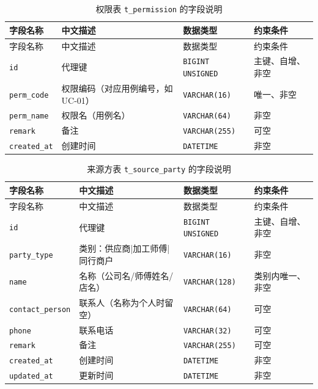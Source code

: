\documentclass[12pt, a4paper]{ctexart}
\newcommand{\code}[1]{\texttt{\small #1}}
\begin{document}
\begin{longtable}{@{}p{3.1cm} p{4.5cm} p{2.4cm} p{4.5cm}@{}}
\caption{权限表 \code{t\_permission} 的字段说明}\label{tab:f-t-permission}\\
\toprule
字段名称 & 中文描述 & 数据类型 & 约束条件 \\
\midrule
\endfirsthead
\toprule
字段名称 & 中文描述 & 数据类型 & 约束条件 \\
\midrule
\endhead
\bottomrule
\endlastfoot
\code{id} & 代理键 & \code{BIGINT UNSIGNED} & 主键、自增、非空 \\
\code{perm\_code} & 权限编码（对应用例编号，如 UC-01） & \code{VARCHAR(16)} & 唯一、非空 \\
\code{perm\_name} & 权限名（用例名） & \code{VARCHAR(64)} & 非空 \\
\code{remark} & 备注 & \code{VARCHAR(255)} & 可空 \\
\code{created\_at} & 创建时间 & \code{DATETIME} & 非空 \\
\end{longtable}

\begin{longtable}{@{}p{3.1cm} p{4.5cm} p{2.4cm} p{4.5cm}@{}}
\caption{来源方表 \code{t\_source\_party} 的字段说明}\label{tab:f-t-source-party}\\
\toprule
字段名称 & 中文描述 & 数据类型 & 约束条件 \\
\midrule
\endfirsthead
\toprule
字段名称 & 中文描述 & 数据类型 & 约束条件 \\
\midrule
\endhead
\bottomrule
\endlastfoot
\code{id} & 代理键 & \code{BIGINT UNSIGNED} & 主键、自增、非空 \\
\code{party\_type} & 类别：供应商|加工师傅|同行商户 & \code{VARCHAR(16)} & 非空 \\
\code{name} & 名称（公司名/师傅姓名/店名） & \code{VARCHAR(128)} & 类别内唯一、非空 \\
\code{contact\_person} & 联系人（名称为个人时留空） & \code{VARCHAR(64)} & 可空 \\
\code{phone} & 联系电话 & \code{VARCHAR(32)} & 可空 \\
\code{remark} & 备注 & \code{VARCHAR(255)} & 可空 \\
\code{created\_at} & 创建时间 & \code{DATETIME} & 非空 \\
\code{updated\_at} & 更新时间 & \code{DATETIME} & 非空 \\
\end{longtable}
\end{document}
